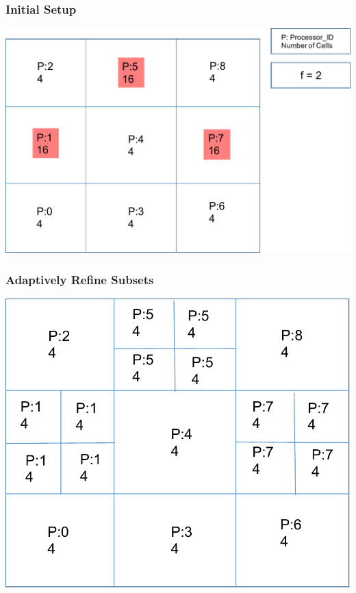 \documentclass[]{beamer}
\begin{document}
\begin{frame}[t]\frametitle{Initial Setup}
\centering
\includegraphics[scale=0.5]{figures/initial_setup.pdf}
\end{frame}

\begin{frame}[t]\frametitle{Adaptively Refine Subsets}
\centering
\includegraphics[scale=0.5]{figures/amr.pdf}
\end{frame}
\end{document}

